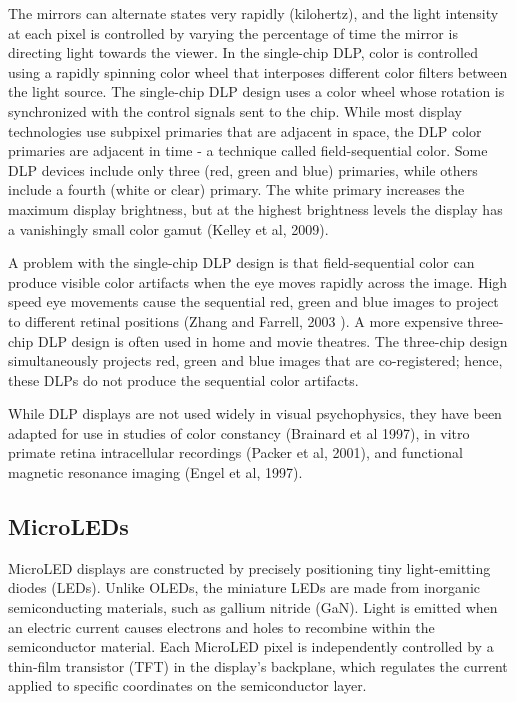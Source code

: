 \documentclass[
  letterpaper,
]{book}
\begin{document}
The mirrors can alternate states very rapidly (kilohertz), and the light
intensity at each pixel is controlled by varying the percentage of time
the mirror is directing light towards the viewer. In the single-chip
DLP, color is controlled using a rapidly spinning color wheel that
interposes different color filters between the light source. The
single-chip DLP design uses a color wheel whose rotation is synchronized
with the control signals sent to the chip. While most display
technologies use subpixel primaries that are adjacent in space, the DLP
color primaries are adjacent in time - a technique called
field-sequential color. Some DLP devices include only three (red, green
and blue) primaries, while others include a fourth (white or clear)
primary. The white primary increases the maximum display brightness, but
at the highest brightness levels the display has a vanishingly small
color gamut (Kelley et al, 2009).

A problem with the single-chip DLP design is that field-sequential color
can produce visible color artifacts when the eye moves rapidly across
the image. High speed eye movements cause the sequential red, green and
blue images to project to different retinal positions (Zhang and
Farrell, 2003 ). A more expensive three-chip DLP design is often used in
home and movie theatres. The three-chip design simultaneously projects
red, green and blue images that are co-registered; hence, these DLPs do
not produce the sequential color artifacts.

While DLP displays are not used widely in visual psychophysics, they
have been adapted for use in studies of color constancy (Brainard et al
1997), in vitro primate retina intracellular recordings (Packer et al,
2001), and functional magnetic resonance imaging (Engel et al, 1997).

\subsection{\texorpdfstring{\textbf{MicroLEDs}}{MicroLEDs}}\label{microleds}

MicroLED displays are constructed by precisely positioning tiny
light-emitting diodes (LEDs). Unlike OLEDs, the miniature LEDs are made
from inorganic semiconducting materials, such as gallium nitride (GaN).
Light is emitted when an electric current causes electrons and holes to
recombine within the semiconductor material. Each MicroLED pixel is
independently controlled by a thin-film transistor (TFT) in the
display's backplane, which regulates the current applied to specific
coordinates on the semiconductor layer.
\end{document}
